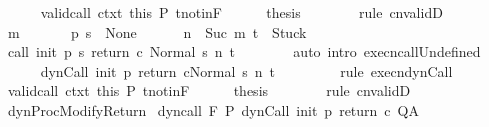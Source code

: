 \begin{isabellebody}
\ \ \ \ \isamarkupfalse%
\ valid{\isacharunderscore}call\ ctxt\ this\ P\ t{\isacharunderscore}notin{\isacharunderscore}F\isanewline
\ \ \ \ \isamarkupfalse%
\ {\isacharquery}thesis\isanewline
\ \ \ \ \ \ \isamarkupfalse%
\ {\isacharparenleft}rule\ cnvalidD{\isacharparenright}\isanewline
\ \ \isamarkupfalse%
\isanewline
\ \ \ \ \isamarkupfalse%
\ m\isanewline
\ \ \ \ \isamarkupfalse%
\ {\isachardoublequoteopen}{\isasymGamma}\ {\isacharparenleft}p\ s{\isacharparenright}\ {\isacharequal}\ None{\isachardoublequoteclose}\isanewline
\ \ \ \ \ \ {\isachardoublequoteopen}n\ {\isacharequal}\ Suc\ m{\isachardoublequoteclose}\ {\isachardoublequoteopen}t\ {\isacharequal}\ Stuck{\isachardoublequoteclose}\isanewline
\ \ \ \ \isamarkupfalse%
\ {\isachardoublequoteopen}{\isasymGamma}{\isasymturnstile}{\isasymlangle}call\ init\ {\isacharparenleft}p\ s{\isacharparenright}\ return{\isacharprime}\ c\ {\isacharcomma}Normal\ s{\isasymrangle}\ {\isacharequal}n{\isasymRightarrow}\ t{\isachardoublequoteclose}\isanewline
\ \ \ \ \ \ \isamarkupfalse%
\ {\isacharparenleft}auto\ intro{\isacharcolon}\ execn{\isacharunderscore}callUndefined{\isacharparenright}\isanewline
\ \ \ \ \isamarkupfalse%
\ {\isachardoublequoteopen}{\isasymGamma}{\isasymturnstile}{\isasymlangle}dynCall\ init\ p\ return{\isacharprime}\ c{\isacharcomma}Normal\ s{\isasymrangle}\ {\isacharequal}n{\isasymRightarrow}\ t{\isachardoublequoteclose}\ \isanewline
\ \ \ \ \ \ \isamarkupfalse%
\ {\isacharparenleft}rule\ execn{\isacharunderscore}dynCall{\isacharparenright}\isanewline
\ \ \ \ \isamarkupfalse%
\ valid{\isacharunderscore}call\ ctxt\ this\ P\ t{\isacharunderscore}notin{\isacharunderscore}F\isanewline
\ \ \ \ \isamarkupfalse%
\ {\isacharquery}thesis\isanewline
\ \ \ \ \ \ \isamarkupfalse%
\ {\isacharparenleft}rule\ cnvalidD{\isacharparenright}\isanewline
\ \ \isamarkupfalse%
\isanewline
{}\isamarkupfalse%
%
\endisatagproof
{\isafoldproof}%
%
\isadelimproof
\isanewline
%
\endisadelimproof
\isanewline
{}\isamarkupfalse%
\ dynProcModifyReturn{\isacharcolon}\isanewline
{}\ dyn{\isacharunderscore}call{\isacharcolon}\ {\isachardoublequoteopen}{\isasymGamma}{\isacharcomma}{\isasymTheta}{\isasymturnstile}\isactrlbsub {\isacharslash}F\isactrlesub \ P\ dynCall\ init\ p\ return{\isacharprime}\ c\ Q{\isacharcomma}A{\isachardoublequoteclose}\isanewline

\end{isabellebody}
